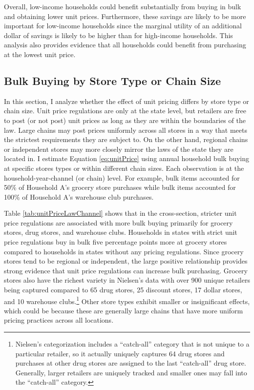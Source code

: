 \documentclass[AER]{AEA_mal}
\begin{document}


Overall, low-income households could benefit substantially from buying in bulk and obtaining lower unit prices. Furthermore, these savings are likely to be more important for low-income households since the marginal utility of an additional dollar of savings is likely to be higher than for high-income households. This analysis also provides evidence that all households could benefit from purchasing at the lowest unit price.

\subsection{Bulk Buying by Store Type or Chain Size}
In this section, I analyze whether the effect of unit pricing differs by store type or chain size. Unit price regulations are only at the state level, but retailers are free to post (or not post) unit prices as long as they are within the boundaries of the law. Large chains may post prices uniformly across all stores in a way that meets the strictest requirements they are subject to. On the other hand, regional chains or independent stores may more closely mirror the laws of the state they are located in. I estimate Equation \ref{eq:unitPrice} using annual household bulk buying at specific stores types or within different chain sizes. Each observation is at the household-year-channel (or chain) level. For example, bulk items accounted for 50\% of Household A's grocery store purchases while bulk items accounted for 100\% of Household A's warehouse club purchases.



Table \ref{tab:unitPriceLawChannel} shows that in the cross-section, stricter unit price regulations are associated with more bulk buying primarily for grocery stores, drug stores, and warehouse clubs. Households in states with strict unit price regulations buy in bulk five percentage points more at grocery stores compared to households in states without any pricing regulations. Since grocery stores tend to be regional or independent, the large positive relationship provides strong evidence that unit price regulations can increase bulk purchasing. Grocery stores also have the richest variety in Nielsen's data with over 900 unique retailers being captured compared to 65 drug stores, 25 discount stores, 17 dollar stores, and 10 warehouse clubs.\footnote{Nielsen's categorization includes a ``catch-all'' category that is not unique to a particular retailer, so it actually uniquely captures 64 drug stores and purchases at other drug stores are assigned to the last ``catch-all'' drug store. Generally, larger retailers are uniquely tracked and smaller ones may fall into the ``catch-all'' category.} Other store types exhibit smaller or insignificant effects, which could be because these are generally large chains that have more uniform pricing practices across all locations.
\end{document}
